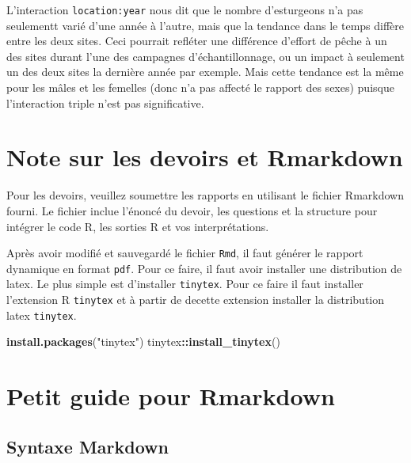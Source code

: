 \documentclass[
  12pt,
]{book}
\newenvironment{Shaded}{\begin{snugshade}}{\end{snugshade}}
\newcommand{\KeywordTok}[1]{\textcolor[rgb]{0.13,0.29,0.53}{\textbf{#1}}}
\newcommand{\NormalTok}[1]{#1}
\newcommand{\OperatorTok}[1]{\textcolor[rgb]{0.81,0.36,0.00}{\textbf{#1}}}
\newcommand{\StringTok}[1]{\textcolor[rgb]{0.31,0.60,0.02}{#1}}
\begin{document}
L'interaction \texttt{location:year} nous dit que le nombre d'esturgeons n'a pas seulementt varié d'une année à l'autre, mais que la tendance dans le temps diffère entre les deux sites. Ceci pourrait refléter une différence d'effort de pêche à un des sites durant l'une des campagnes d'échantillonnage, ou un impact à seulement un des deux sites la dernière année par exemple. Mais cette tendance est la même pour les mâles et les femelles (donc n'a pas affecté le rapport des sexes) puisque l'interaction triple n'est pas significative.

\cleardoublepage

\hypertarget{appendix-appendices}{%
\appendix {}}


\hypertarget{note-sur-les-devoirs-et-rmarkdown}{%
\chapter{Note sur les devoirs et Rmarkdown}\label{note-sur-les-devoirs-et-rmarkdown}}

Pour les devoirs, veuillez soumettre les rapports en utilisant le fichier Rmarkdown fourni.
Le fichier inclue l'énoncé du devoir, les questions et la structure pour intégrer le code R, les sorties R et vos interprétations.

Après avoir modifié et sauvegardé le fichier \texttt{Rmd}, il faut générer le rapport dynamique en format \texttt{pdf}.
Pour ce faire, il faut avoir installer une distribution de latex. Le plus simple est d'installer \texttt{tinytex}. Pour ce faire il faut installer l'extension R \texttt{tinytex} et à partir de decette extension installer la distribution latex \texttt{tinytex}.

\begin{Shaded}
\begin{Highlighting}[]
\KeywordTok{install.packages}\NormalTok{(}\StringTok{"tinytex"}\NormalTok{)}
\NormalTok{tinytex}\OperatorTok{::}\KeywordTok{install\_tinytex}\NormalTok{()}
\end{Highlighting}
\end{Shaded}

\hypertarget{petit-guide-pour-rmarkdown}{%
\chapter{Petit guide pour Rmarkdown}\label{petit-guide-pour-rmarkdown}}

\hypertarget{syntaxe-markdown}{%
\section{Syntaxe Markdown}\label{syntaxe-markdown}}
\end{document}
